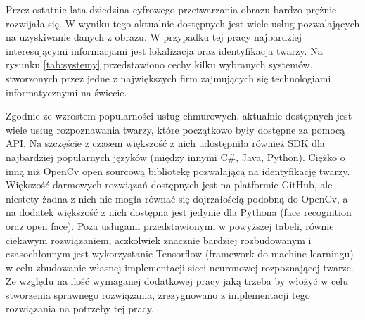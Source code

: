Przez ostatnie lata dziedzina cyfrowego przetwarzania obrazu bardzo prężnie rozwijała się. W wyniku tego aktualnie dostępnych jest wiele usług pozwalających na uzyskiwanie danych z obrazu. W przypadku tej pracy najbardziej interesującymi informacjami jest lokalizacja oraz identyfikacja twarzy.
Na rysunku \ref{tab:systemy} przedstawiono cechy kilku wybranych systemów, stworzonych przez jedne z największych firm zajmujących się technologiami informatycznymi na świecie.

\begin{table}[H]\label{tab:systemy}
	\centering
	\caption{Dostępne systemy przetwarzania obrazu}
\end{table}
Zgodnie ze wzrostem popularności usług chmurowych, aktualnie dostępnych jest wiele usług rozpoznawania twarzy, które początkowo były dostępne za pomocą API. Na szczęście z czasem większość z nich udostępniła również SDK dla najbardziej popularnych języków (między innymi C\#, Java, Python). Ciężko o inną niż OpenCv open sourcową bibliotekę pozwalającą na identyfikację twarzy. Większość darmowych rozwiązań dostępnych jest na platformie GitHub, ale niestety żadna z nich nie mogła równać się dojrzałością podobną do OpenCv, a na dodatek większość z nich dostępna jest jedynie dla Pythona (face recognition oraz open face).
Poza usługami przedstawionymi w powyższej tabeli, równie ciekawym rozwiązaniem, aczkolwiek znacznie bardziej rozbudowanym i czasochłonnym jest wykorzystanie Tensorflow (framework do machine learningu) w celu zbudowanie własnej implementacji sieci neuronowej rozpoznającej twarze. Ze względu na ilość wymaganej dodatkowej pracy jaką trzeba by włożyć w celu stworzenia sprawnego rozwiązania, zrezygnowano z implementacji tego rozwiązania na potrzeby tej pracy.
